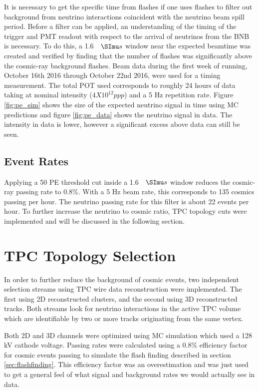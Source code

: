 It is necessary to get the specific time from flashes if one uses flashes to filter out background from neutrino interactions coincident with the neutrino beam spill period. Before a filter can be applied, an understanding of the timing of the trigger and PMT readout with respect to the arrival of neutrinos from the BNB is necessary. To do this, a 1.6 $\micro s$ window near the expected beamtime was created and verified by finding that the number of flashes was significantly above the cosmic-ray background flashes. Beam data during the first week of running, October 16th 2016 through October 22nd 2016, were used for a timing measurement. The total POT used corresponds to roughly 24 hours of data taking at nominal intensity ($4 X 10^{12} ppp$) and a 5 Hz repetition rate. Figure \ref{fig:pe_sim} shows the size of the expected neutrino signal in time using MC predictions and figure \ref{fig:pe_data} shows the neutrino signal in data. The intensity in data is lower, however a significant excess above data can still be seen.

\subsection{Event Rates}
Applying a 50 PE threshold cut inside a 1.6 $\micro s$ window reduces the cosmic-ray passing rate to 0.8\%. With a 5 Hz beam rate, this corresponds to 135 cosmics passing per hour. The neutrino passing rate for this filter is about 22 events per hour. To further increase the neutrino to cosmic ratio, TPC topology cuts were implemented and will be discussed in the following section.
\section{TPC Topology Selection}  
In order to further reduce the background of cosmic events, two independent selection streams using TPC wire data reconstruction were implemented. The first using 2D reconstructed clusters, and the second using 3D reconstructed tracks. Both streams look for neutrino interactions in the active TPC volume which are identifiable by two or more tracks originating from the same vertex.

Both 2D and 3D channels were optimized using MC simulation which used a 128 kV cathode voltage. Passing rates were calculated using a 0.8\% efficiency factor for cosmic events passing to simulate the flash finding described in section \ref{sec:flashfinding}. This efficiency factor was an overestimation and was just used to get a general feel of what signal and background rates we would actually see in data. 
